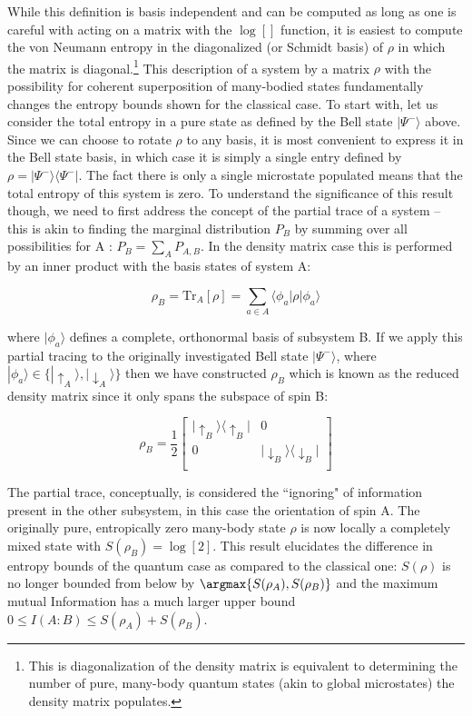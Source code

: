 While this definition is basis independent and can be computed as long as one is careful with acting on a matrix with the $\log[]$ function, it is easiest to compute the von Neumann entropy in the diagonalized (or Schmidt basis) of $\rho$ in which the matrix is diagonal.\footnote{This is diagonalization of the density matrix is equivalent to determining the number of pure, many-body quantum states (akin to global microstates) the density matrix populates.} This description of a system by a matrix $\rho$ with the possibility for coherent superposition of many-bodied states fundamentally changes the entropy bounds shown for the classical case. To start with, let us consider the total entropy in a pure state as defined by the Bell state $|\Psi^-\rangle$ above. Since we can choose to rotate $\rho$ to any basis, it is most convenient to express it in the Bell state basis, in which case it is simply a single entry defined by $\rho=|\Psi^-\rangle \langle \Psi^-|$. The fact there is only a single microstate populated means that the total entropy of this system is zero. To understand the significance of this result though, we need to first address the concept of the partial trace of a system -- this is akin to finding the marginal distribution $P_B$ by summing over all possibilities for A : $P_B = \sum_A P_{A,B}$. In the density matrix case this is performed by an inner product with the basis states of system A:

\begin{equation}
\label{eqn:partTr}
\rho_B = \mathrm{Tr}_A [ \rho] = \sum_{a \in A} \langle \phi_a | \rho | \phi_a \rangle
\end{equation}

where $|\phi_a\rangle$ defines a complete, orthonormal basis of subsystem B. If we apply this partial tracing to the originally investigated Bell state $|\Psi^-\rangle$, where $| \phi_a \rangle \in \{ |\uparrow_A\rangle, |\downarrow_A\rangle \}$ then we have constructed $\rho_B$ which is known as the reduced density matrix since it only spans the subspace of spin B:

\[
\rho_B = \frac{1}{2} \begin{bmatrix}
| \uparrow_B \rangle \langle \uparrow_B | & 0  \\
0 & | \downarrow_B \rangle \langle \downarrow_B | \\
\end{bmatrix}
\]

The partial trace, conceptually, is considered the ``ignoring" of information present in the other subsystem, in this case the orientation of spin A. The originally pure, entropically zero many-body state $\rho$ is now locally a completely mixed state with $S(\rho_{B})=\log[2]$. This result elucidates the difference in entropy bounds of the quantum case as compared to the classical one: $S(\rho)$ is no longer bounded from below by $\argmax\{S(\rho_A), S(\rho_B) \}$ and the maximum mutual Information has a much larger upper bound $0\leq I(A:B) \leq S(\rho_A)+S(\rho_B)$.

